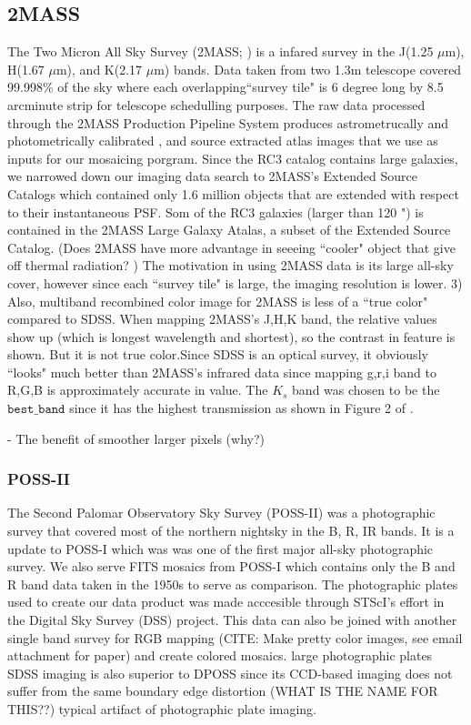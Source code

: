 \documentclass[5p]{elsarticle}
\begin{document}
	\subsection{2MASS}
	 The Two Micron All Sky Survey (2MASS; \citet{2mass}) is a infared survey in the J(1.25 $\mu$m), H(1.67 $\mu$m), and K(2.17 $\mu$m) bands. Data taken from two 1.3m telescope  covered 99.998\% of the sky where each overlapping``survey tile" is 6 degree long by 8.5 arcminute strip for telescope schedulling purposes. The raw data processed through the 2MASS Production Pipeline System produces astrometrucally and photometrically calibrated , and source extracted atlas images that we use as inputs for our mosaicing porgram. Since the RC3 catalog contains large galaxies, we narrowed down our imaging data search to  2MASS's  Extended Source Catalogs which contained only 1.6 million objects that are extended with respect to their instantaneous PSF.%
	 Som of the RC3 galaxies (larger than 120 ") is contained in the 2MASS Large Galaxy Atalas, a subset of the Extended Source Catalog.
	(Does 2MASS have more advantage in seeeing ``cooler" object that give off thermal radiation? ) The motivation in using 2MASS data is its large all-sky cover, however since each ``survey tile" is large, the imaging resolution is lower. 3) Also, multiband recombined color image for 2MASS is less of a ``true color" compared to SDSS. When mapping 2MASS's J,H,K band, the relative values show up (which is longest wavelength and shortest), so the contrast in feature is shown. But it is not true color.Since  SDSS is an optical survey, it obviously ``looks" much better than 2MASS's infrared data since mapping g,r,i band to R,G,B is approximately accurate in value. 
	 The $K_s$ band was chosen to be the $\texttt{best\_band}$ since it has the highest transmission as shown  in Figure 2 of \citet{2mass}.

 - The benefit of smoother larger pixels (why?)
	\subsubsection{POSS-II}
	The Second Palomar Observatory Sky Survey (POSS-II) was a photographic survey that covered most of the northern nightsky  in the B, R, IR bands.	It is a update to POSS-I which was 	was one of the first major all-sky photographic survey. We also serve FITS mosaics from POSS-I which contains only the B and R band data taken in the 1950s to serve as comparison.  The photographic plates used to create our data product was made acccesible through  STScI's effort in the Digital Sky Survey (DSS) project. This data can also be joined with another single band survey  for RGB mapping (CITE: Make pretty color images, see email attachment for paper) and create colored mosaics.
	large photographic plates 
	SDSS imaging is also superior to DPOSS since its CCD-based imaging does not suffer from the same  boundary edge distortion (WHAT IS THE NAME FOR THIS??) typical artifact of photographic plate imaging.
\end{document}
